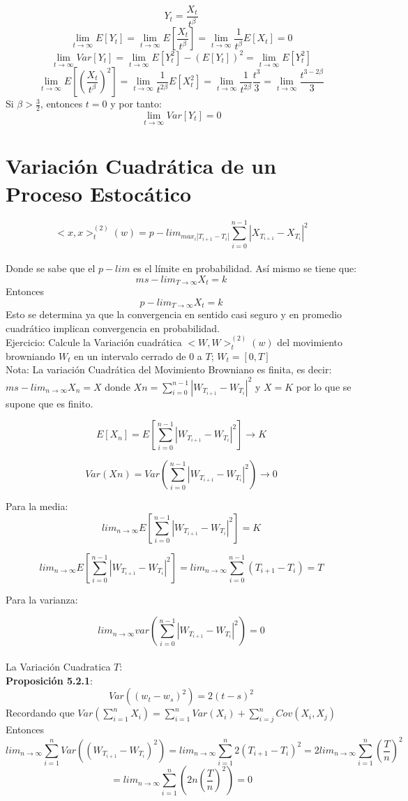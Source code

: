 \documentclass[11pt,fleqn]{book} %
\numberwithin{equation}{section} %
\numberwithin{figure}{section} %
\numberwithin{table}{section} %
\begin{document}
$$ Y_{t} = \frac{X_{t}}{t^{\beta}} $$
$$ \lim_{t \to \infty} E[Y_{t}] = \lim_{t \to \infty} E[\frac{X_{t}}{t^{\beta}}] = \lim_{t \to \infty} \frac{1}{t^{\beta}} E[X_{t}] = 0   $$
$$ \lim_{t \to \infty} Var[Y_{t}] = \lim_{t \to \infty} E[Y_{t}^2] - (E[Y_{t}])^2  = \lim_{t \to \infty} E[Y_{t}^2]$$
$$ \lim_{t \to \infty} E[(\frac{X_{t}}{t^{\beta}})^2] =  \lim_{t \to \infty} \frac{1}{t^{2\beta}} E[X_{t}^2] = \lim_{t \to \infty} \frac{1}{t^{2\beta}} \frac{t^{3}}{3}  =  \lim_{t \to \infty} \frac{t^{3-2\beta}}{3}$$
Si $\beta > \frac{3}{2}$, entonces $t=0$ y por tanto:
$$ \lim_{t \to \infty} Var[Y_{t}] = 0 $$
\section{Variación Cuadrática de un Proceso Estocático}
$$<x,x>^{(2)}_{t}(w) =p-lim_{max_i|T_{i+1}-T_{i}|} \sum^{n-1}_{i=0}|X_{T_{i+1}}-X_{T_{i}}|^2  $$ 
\ \\%
Donde se sabe que el $p-lim$ es el límite en probabilidad.  Así mismo se tiene que: 
$$ms-lim_{T\rightarrow \infty} X_t=k$$ 
Entonces
$$p-lim_{T\rightarrow \infty} X_t=k$$ 
Esto se determina ya que la convergencia en sentido casi seguro y en promedio cuadrático implican convergencia en probabilidad. 
\ \\%
Ejercicio: Calcule la Variación cuadrática $<W,W>^{(2)}_{t}(w)$ del movimiento browniando $W_t$ en un intervalo cerrado de $0$ a $T$; $W_t=[0,T]$
\ \\%
Nota: La variación Cuadrática del Movimiento Browniano es finita, es decir:
\ \\%
$ms-lim_{n\rightarrow \infty} X_n=X$ donde $Xn=\sum^{n-1}_{i=0}|W_{T_{i+1}}-W_{T_{i}}|^2$ y $X=K$ por lo que se supone que es finito. 

$$E[X_n]=E[ \sum^{n-1}_{i=0}|W_{T_{i+1}}-W_{T_{i}}|^2] \rightarrow K$$

$$Var(Xn)=Var( \sum^{n-1}_{i=0}|W_{T_{i+1}}-W_{T_{i}}|^2)\rightarrow 0$$

Para la media:
$$lim_{n \rightarrow \infty} E[ \sum^{n-1}_{i=0}|W_{T_{i+1}}-W_{T_{i}}|^2]=K$$

$$lim_{n \rightarrow \infty} E[ \sum^{n-1}_{i=0}|W_{T_{i+1}}-W_{T_{i}}|^2]=lim_{n \rightarrow \infty} \sum^{n-1}_{i=0}(T_{i+1}-T_i)=T$$

Para la varianza:

$$lim_{n \rightarrow \infty} var( \sum^{n-1}_{i=0}|W_{T_{i+1}}-W_{T_{i}}|^2)=0$$
\ \\%
La Variación Cuadratica $T$:
\ \\%
\textbf{Proposición 5.2.1}: 
$$ Var((w_{t}-w_{s})^{2}) = 2(t-s)^{2}$$
Recordando que $Var (\sum^{n}_{i=1}X_i)=\sum^{n}_{i=1}Var(X_i)+\sum^{n}_{i=j}Cov(X_i,X_j)$
Entonces 
$$lim_{n \rightarrow \infty}\sum^{n}_{i=1}Var((W_{T_{i+1}}-W_{T_{i}})^2)=lim_{n \rightarrow \infty}\sum^{n}_{i=1}2(T_{i+1}-T_i)^2=2lim_{n \rightarrow \infty}\sum^{n}_{i=1}(\frac{T}{n})^2$$
$$=lim_{n \rightarrow \infty}\sum^{n}_{i=1}(2n(\frac{T}{n})^2)=0$$
\end{document}
